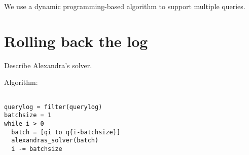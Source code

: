 We use a dynamic programming-based algorithm to support multiple queries.




\section{Rolling back the log}

Describe Alexandra's solver.

Algorithm:

\begin{verbatim}

querylog = filter(querylog)
batchsize = 1
while i > 0
  batch = [qi to q{i-batchsize}]
  alexandras_solver(batch)
  i -= batchsize

\end{verbatim}

